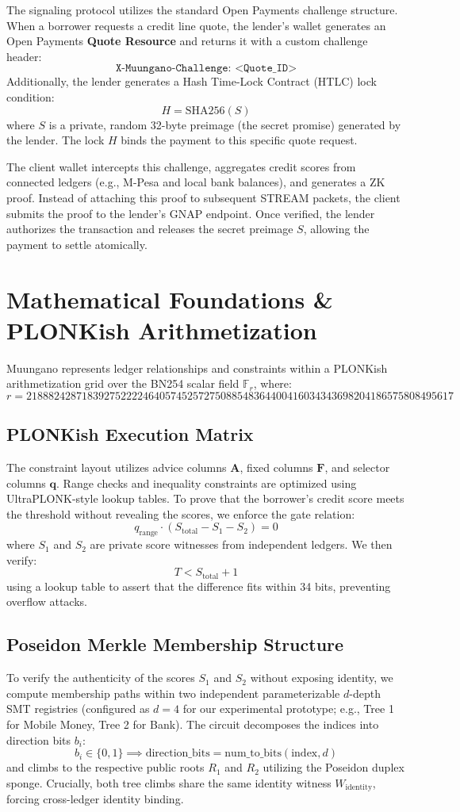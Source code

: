 \documentclass[12pt]{article}
\begin{document}
The signaling protocol utilizes the standard Open Payments challenge structure. When a borrower requests a credit line quote, the lender's wallet generates an Open Payments \textbf{Quote Resource} and returns it with a custom challenge header:
\[ \texttt{X-Muungano-Challenge: <Quote\_ID>} \]
Additionally, the lender generates a Hash Time-Lock Contract (HTLC) lock condition:
\[ H = \text{SHA256}(S) \]
where $S$ is a private, random 32-byte preimage (the secret promise) generated by the lender. The lock $H$ binds the payment to this specific quote request.

The client wallet intercepts this challenge, aggregates credit scores from connected ledgers (e.g., M-Pesa and local bank balances), and generates a ZK proof. Instead of attaching this proof to subsequent STREAM packets, the client submits the proof to the lender's GNAP endpoint. Once verified, the lender authorizes the transaction and releases the secret preimage $S$, allowing the payment to settle atomically.

\newpage

\section{Mathematical Foundations \& PLONKish Arithmetization}
Muungano represents ledger relationships and constraints within a PLONKish arithmetization grid over the BN254 scalar field $\mathbb{F}_r$, where:
\[ r = 21888242871839275222246405745257275088548364400416034343698204186575808495617 \]

\subsection{PLONKish Execution Matrix}
The constraint layout utilizes advice columns $\mathbf{A}$, fixed columns $\mathbf{F}$, and selector columns $\mathbf{q}$. Range checks and inequality constraints are optimized using UltraPLONK-style lookup tables. To prove that the borrower's credit score meets the threshold without revealing the scores, we enforce the gate relation:
\[ q_{\text{range}} \cdot (S_{\text{total}} - S_1 - S_2) = 0 \]
where $S_1$ and $S_2$ are private score witnesses from independent ledgers. We then verify:
\[ T < S_{\text{total}} + 1 \]
using a lookup table to assert that the difference fits within 34 bits, preventing overflow attacks.

\subsection{Poseidon Merkle Membership Structure}
To verify the authenticity of the scores $S_1$ and $S_2$ without exposing identity, we compute membership paths within two independent parameterizable $d$-depth SMT registries (configured as $d=4$ for our experimental prototype; e.g., Tree 1 for Mobile Money, Tree 2 for Bank). The circuit decomposes the indices into direction bits $b_i$:
\[ b_i \in \{0, 1\} \implies \text{direction\_bits} = \text{num\_to\_bits}(\text{index}, d) \]
and climbs to the respective public roots $R_1$ and $R_2$ utilizing the Poseidon duplex sponge. Crucially, both tree climbs share the same identity witness $W_{\text{identity}}$, forcing cross-ledger identity binding.
\end{document}
